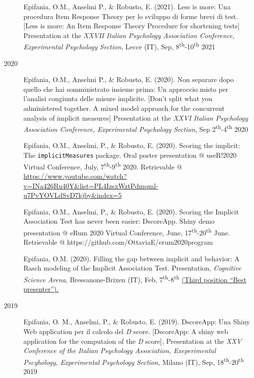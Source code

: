 \documentclass[letterpaper,12pt]{article}
\begin{document}
\begin{description}
		\item[] Epifania, O.M., Anselmi P., \& Robusto, E. (2021). Less is more: Una procedura Item Response Theory per lo sviluppo di forme brevi di test. [Less is more: An Item Response Theory Procedure for shortening tests] Presentation at the \emph{XXVII Italian Psychology Association Conference, Experimental Psychology Section}, Lecce (IT), Sep, 8\textsuperscript{th}-10\textsuperscript{th} 2021
		
		\item[2020] 
		

	
	\item[] 	Epifania, O.M., Anselmi P., \& Robusto, E. (2020). Non separare dopo quello che hai somministrato insieme prima: Un approccio misto per l’analisi congiunta delle misure implicite. [Don't split what you administered together. A mixed model approach for the concurrent analysis of implicit measures] Presentation at the \emph{XXVI Italian Psychology Association Conference, Experimental Psychology Section}, Sep 2\textsuperscript{th}-4\textsuperscript{th} 2020
	
	\item[] 	Epifania, O.M., Anselmi, P., \& Robusto, E. (2020). Scoring the implicit: The \texttt{implicitMeasures} package. Oral poster presentation @ useR!2020 Virtual Conference, July, 7\textsuperscript{th}-9\textsuperscript{th}  2020.  Retrievable @ \href{https://www.youtube.com/watch?v=INa426Ru40Y&list=PL4IzsxWztPdmqml-u7PvYOVLdSvD7kjby&index=5}{https://www.youtube.com/watch?v=INa426Ru40Y\&list=PL4IzsxWztPdmqml-u7PvYOVLdSvD7kjby\&index=5}
	
	\item[] 	Epifania, O.M., Anselmi, P., \& Robusto, E. (2020). Scoring the Implicit Association Test has never been easier: DscoreApp. Shiny demo presentation @ eRum 2020 Virtual Conference, June, 17\textsuperscript{th}-20\textsuperscript{th} June. Retrievable @ https://github.com/OttaviaE/erum2020program
	
	\item[] 	Epifania, O.M. (2020). Filling the gap between implicit and behavior: A Rasch modeling of the Implicit Association Test. Presentation, \emph{Cognitive Science Arena}, Bressanone-Brixen (IT), Feb, 7\textsuperscript{th}-8\textsuperscript{th} \underline{(Third position ``Best presenter'').}
	
	\item[2019] 
	\item[] 	Epifania, O. M., Anselmi, P., \& Robusto, E. (2019). DscoreApp: Una Shiny Web application per il calcolo del \emph{D} score. [DscoreApp: A shiny web application for the computaion of the \emph{D} score], Presentation at the \emph{XXV Conference of the Italian Psychology Association, Exeperimental Pscyhology, Experimental Psychology Section}, Milano (IT), Sep, 18\textsuperscript{th}-20\textsuperscript{th} 2019
	

\end{description}
\end{document}
